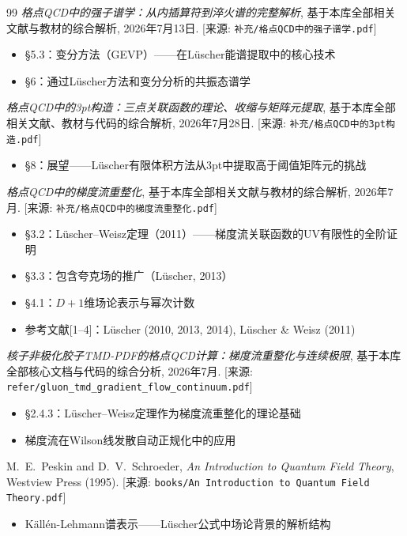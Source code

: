 \documentclass[12pt,a4paper]{ctexart}
\theoremstyle{definition}
\begin{document}
\begin{thebibliography}{99}
\textit{格点QCD中的强子谱学：从内插算符到淬火谱的完整解析},
基于本库全部相关文献与教材的综合解析, 2026年7月13日.
[来源: \texttt{补充/格点QCD中的强子谱学.pdf}]
\begin{itemize}
    \item §5.3：变分方法（GEVP）——在L\"uscher能谱提取中的核心技术
    \item §6：通过L\"uscher方法和变分分析的共振态谱学
\end{itemize}

\textit{格点QCD中的3pt构造：三点关联函数的理论、收缩与矩阵元提取},
基于本库全部相关文献、教材与代码的综合解析, 2026年7月28日.
[来源: \texttt{补充/格点QCD中的3pt构造.pdf}]
\begin{itemize}
    \item §8：展望——L\"uscher有限体积方法从3pt中提取高于阈值矩阵元的挑战
\end{itemize}

\textit{格点QCD中的梯度流重整化},
基于本库全部相关文献与教材的综合解析, 2026年7月.
[来源: \texttt{补充/格点QCD中的梯度流重整化.pdf}]
\begin{itemize}
    \item §3.2：L\"uscher--Weisz定理（2011）——梯度流关联函数的UV有限性的全阶证明
    \item §3.3：包含夸克场的推广（L\"uscher, 2013）
    \item §4.1：$D+1$维场论表示与幂次计数
    \item 参考文献[1--4]：L\"uscher (2010, 2013, 2014), L\"uscher \& Weisz (2011)
\end{itemize}

\textit{核子非极化胶子TMD-PDF的格点QCD计算：梯度流重整化与连续极限},
基于本库全部核心文档与代码的综合分析, 2026年7月.
[来源: \texttt{refer/gluon\_tmd\_gradient\_flow\_continuum.pdf}]
\begin{itemize}
    \item §2.4.3：L\"uscher--Weisz定理作为梯度流重整化的理论基础
    \item 梯度流在Wilson线发散自动正规化中的应用
\end{itemize}

M.~E.~Peskin and D.~V.~Schroeder,
\textit{An Introduction to Quantum Field Theory},
Westview Press (1995).
[来源: \texttt{books/An Introduction to Quantum Field Theory.pdf}]
\begin{itemize}
    \item K\"all\'en-Lehmann谱表示——L\"uscher公式中场论背景的解析结构
\end{itemize}


\end{thebibliography}
\end{document}
